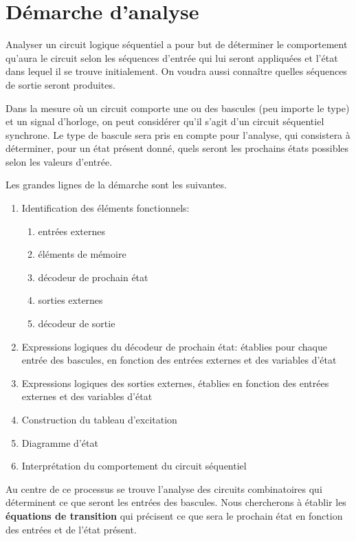 \documentclass[letter, oneside]{book}
\begin{document}
\section{Démarche d'analyse}
\label{sec:org1c644f4}

Analyser un circuit logique séquentiel a pour but de déterminer le
comportement qu'aura le circuit selon les séquences d'entrée qui lui
seront appliquées et l'état dans lequel il se trouve initialement. On
voudra aussi connaître quelles séquences de sortie seront produites.

Dans la mesure où un circuit comporte une ou des bascules (peu importe
le type) et un signal d'horloge, on peut considérer qu'il s'agit d'un
circuit séquentiel synchrone. Le type de bascule sera pris en compte
pour l'analyse, qui consistera à déterminer, pour un état présent
donné, quels seront les prochains états possibles selon les valeurs
d'entrée.

Les grandes lignes de la démarche sont les suivantes.

\begin{enumerate}
\item Identification des éléments fonctionnels:

\begin{enumerate}
\item entrées externes

\item éléments de mémoire

\item décodeur de prochain état

\item sorties externes

\item décodeur de sortie
\end{enumerate}
\item Expressions logiques du décodeur de prochain état: établies pour
chaque entrée des bascules, en fonction des entrées externes et des
variables d'état
\item Expressions logiques des sorties externes, établies en fonction des
entrées externes et des variables d'état
\item Construction du tableau d'excitation
\item Diagramme d'état
\item Interprétation du comportement du circuit séquentiel
\end{enumerate}

Au centre de ce processus se trouve l'analyse des circuits
combinatoires qui déterminent ce que seront les entrées des
bascules. Nous chercherons à établir les \textbf{équations de transition} qui
précisent ce que sera le prochain état en fonction des entrées et de
l'état présent.
\end{document}
